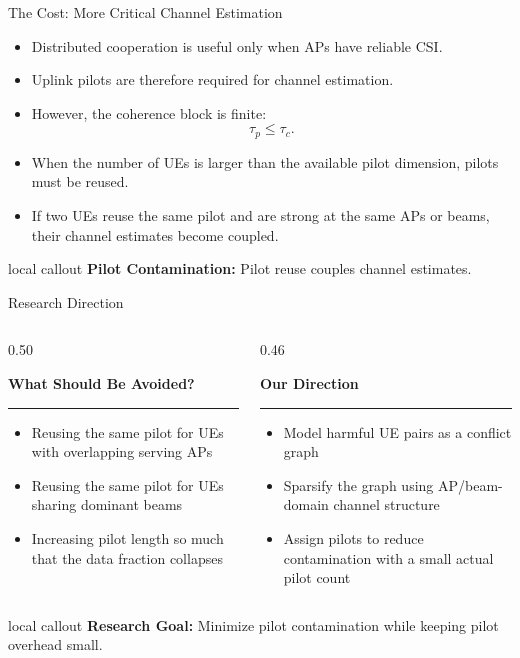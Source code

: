 \documentclass[aspectratio=169, 10pt]{beamer}
\newcommand{\slideheading}[1]{%
    \par\vspace{0.08cm}%
    \settowidth{\dimen0}{\bfseries\large #1}%
    {\bfseries\large #1}%
    \par\vspace{0.015cm}%
    {\color{black}\rule{\dimen0}{0.7pt}}%
    \par\vspace{0.16cm}%
}
\newcommand{\slidecallout}[2]{%
    \vspace{0.08cm}%
    \begin{beamercolorbox}[wd=\linewidth,sep=0.55ex,leftskip=0.8ex,rightskip=0.8ex,rounded=true]{local callout}
        \small{\color{ku_crimson}\bfseries #1:} #2
    \end{beamercolorbox}%
}
\begin{document}
\begin{frame}{The Cost: More Critical Channel Estimation}
    \begin{itemize}
        \setlength{\itemsep}{0.9em}
        \item Distributed cooperation is useful only when APs have reliable CSI.
        \item Uplink pilots are therefore required for channel estimation.
        \item However, the coherence block is finite:
              \[
                  \tau_p \le \tau_c.
              \]
        \item When the number of UEs is larger than the available pilot dimension, pilots must be reused.
        \item If two UEs reuse the same pilot and are strong at the same APs or beams, their channel estimates become coupled.
    \end{itemize}

    \vspace{0.15cm}
    \slidecallout{Pilot Contamination}{Pilot reuse couples channel estimates.}
\end{frame}

\begin{frame}{Research Direction}
    \begin{columns}[T,onlytextwidth]
        \begin{column}{0.50\textwidth}
            \slideheading{What Should Be Avoided?}
            \begin{itemize}
                \setlength{\itemsep}{0.8em}
                \item Reusing the same pilot for UEs with overlapping serving APs
                \item Reusing the same pilot for UEs sharing dominant beams
                \item Increasing pilot length so much that the data fraction collapses
            \end{itemize}
        \end{column}
        \begin{column}{0.46\textwidth}
            \slideheading{Our Direction}
            \begin{itemize}
                \setlength{\itemsep}{0.8em}
                \item Model harmful UE pairs as a conflict graph
                \item Sparsify the graph using AP/beam-domain channel structure
                \item Assign pilots to reduce contamination with a small actual pilot count
            \end{itemize}
        \end{column}
    \end{columns}

    \slidecallout{Research Goal}{Minimize pilot contamination while keeping pilot overhead small.}
\end{frame}
\end{document}
